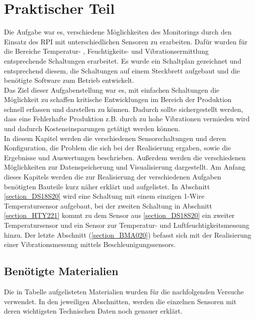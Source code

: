 \chapter{Praktischer Teil}
\label{chapter_Praktischer_Teil}
 Die Aufgabe war es, verschiedene Möglichkeiten des Monitorings durch den Einsatz des \ac{RPI} mit unterschiedlichen Sensoren zu erarbeiten. Dafür wurden für die Bereiche Temperatur- , Feuchtigkeits- und Vibrationsermittlung entsprechende Schaltungen erarbeitet. Es wurde ein Schaltplan gezeichnet und entsprechend diesem, die Schaltungen auf einem Steckbrett aufgebaut und die benötigte Software zum Betrieb entwickelt.\\
Das Ziel dieser Aufgabenstellung war es, mit einfachen Schaltungen die Möglichkeit zu schaffen kritische Entwicklungen im Bereich der Produktion schnell erfassen und darstellen zu können. Dadurch sollte sichergestellt werden, dass eine Fehlerhafte Produktion z.B. durch zu hohe Vibrationen  vermieden wird und dadurch Kosteneinsparungen getätigt werden können.\\
In diesem Kapitel werden die verschiedenen Sensorschaltungen und deren Konfiguration, die Problem
die sich bei der Realisierung ergaben, sowie die Ergebnisse und Auswertungen beschrieben.
Außerdem werden die verschiedenen Möglichkeiten zur Datenspeicherung und Visualisierung dargestellt. Am Anfang dieses Kapitels werden die zur Realisierung der verschiedenen Aufgaben benötigten Bauteile kurz näher erklärt und aufgelistet. In Abschnitt \ref{section_DS18S20} wird eine Schaltung mit einem einzigen 1-Wire Temperatursensor aufgebaut, bei der zweiten Schaltung in Abschnitt \ref{section_HTY221} kommt zu dem Sensor aus \ref{section_DS18S20} ein zweiter Temperatursensor und ein Sensor zur Temperatur- und Luftfeuchtigkeitsmessung hinzu. Der letzte Abschnitt (\ref{section_BMA020}) befasst sich mit der Realisierung einer Vibrationsmessung mittels Beschleunigungssensors.

\section{Benötigte Materialien}
\label{section_Benötigte_Materialien}
Die in Tabelle aufgelisteten Materialien wurden für die nachfolgenden Versuche verwendet. In den jeweiligen Abschnitten, werden die  einzelnen Sensoren mit deren wichtigsten Technischen Daten noch genauer erklärt. 

